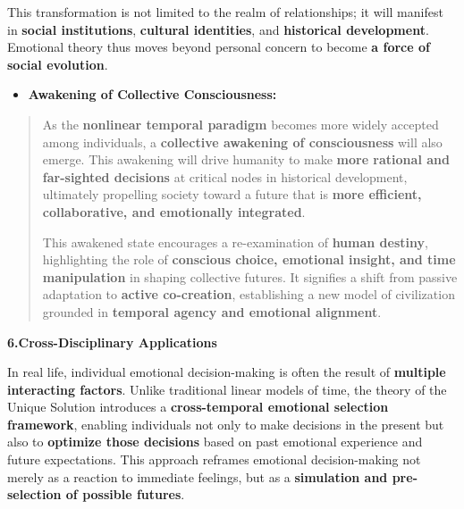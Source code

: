 \documentclass[
]{article}
\begin{document}
This transformation is not limited to the realm of relationships; it
will manifest in \textbf{social institutions}, \textbf{cultural
identities}, and \textbf{historical development}. Emotional theory thus
moves beyond personal concern to become \textbf{a force of social
evolution}.

\begin{itemize}
\item
  \textbf{Awakening of Collective Consciousness:}
\end{itemize}

\begin{quote}
As the \textbf{nonlinear temporal paradigm} becomes more widely accepted
among individuals, a \textbf{collective awakening of consciousness} will
also emerge. This awakening will drive humanity to make \textbf{more
rational and far-sighted decisions} at critical nodes in historical
development, ultimately propelling society toward a future that is
\textbf{more efficient, collaborative, and emotionally integrated}.

This awakened state encourages a re-examination of \textbf{human
destiny}, highlighting the role of \textbf{conscious choice, emotional
insight, and time manipulation} in shaping collective futures. It
signifies a shift from passive adaptation to \textbf{active
co-creation}, establishing a new model of civilization grounded in
\textbf{temporal agency and emotional alignment}.
\end{quote}

\textbf{6.Cross-Disciplinary Applications}

In real life, individual emotional decision-making is often the result
of \textbf{multiple interacting factors}. Unlike traditional linear
models of time, the theory of the Unique Solution introduces a
\textbf{cross-temporal emotional selection framework}, enabling
individuals not only to make decisions in the present but also to
\textbf{optimize those decisions} based on past emotional experience and
future expectations. This approach reframes emotional decision-making
not merely as a reaction to immediate feelings, but as a
\textbf{simulation and pre-selection of possible futures}.
\end{document}
